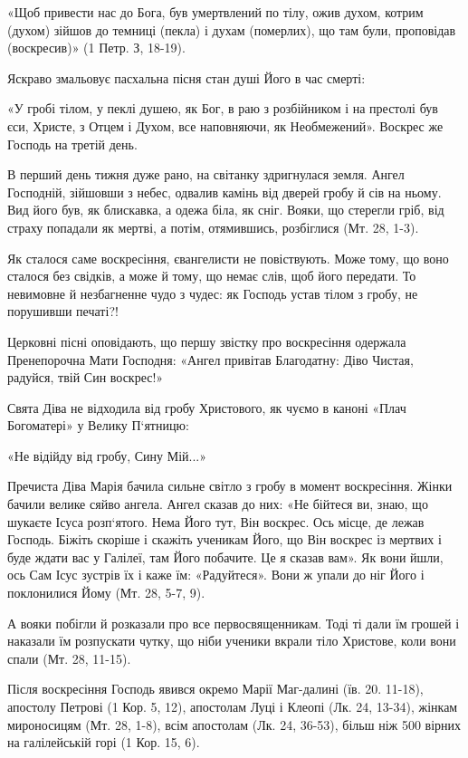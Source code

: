 \documentclass[main.tex]{subfiles}
\begin{document}
«Щоб привести нас до Бога, був умертвлений по тілу, ожив духом, котрим (духом) зійшов до темниці (пекла) і духам (померлих), що там були, проповідав (воскресив)» (1 Петр. З, 18-19).

Яскраво змальовує пасхальна пісня стан душі Його в час смерті:

«У гробі тілом, у пеклі душею, як Бог, в раю з розбійником і на престолі був єси, Христе, з Отцем і Духом, все наповняючи, як Необмежений».
Воскрес же Господь на третій день.

В перший день тижня дуже рано, на світанку здригнулася земля. Ангел Господній, зійшовши з небес, одвалив камінь від дверей гробу й сів на ньому. Вид його був, як блискавка, а одежа біла, як сніг. Вояки, що стерегли гріб, від страху попадали як мертві, а потім, отямившись, розбіглися (Мт. 28, 1-3).

Як сталося саме воскресіння, євангелисти не повіствують. Може тому, що воно сталося без свідків, а може й тому, що немає слів, щоб його передати. То невимовне й незбагненне чудо з чудес: як Господь устав тілом з гробу, не порушивши печаті?!

Церковні пісні оповідають, що першу звістку про воскресіння одержала Пренепорочна Мати Господня: «Ангел привітав Благодатну: Діво Чистая, радуйся, твій Син воскрес!»

Свята Діва не відходила від гробу Христового, як чуємо в каноні «Плач Богоматері» у Велику П`ятницю:
 
«Не відійду від гробу, Сину Мій...»

Пречиста Діва Марія бачила сильне світло з гробу в момент воскресіння. Жінки бачили велике сяйво ангела. Ангел сказав до них: «Не бійтеся ви, знаю, що шукаєте Ісуса розп`ятого. Нема Його тут, Він воскрес. Ось місце, де лежав Господь. Біжіть скоріше і скажіть ученикам Його, що Він воскрес із мертвих і буде ждати вас у Галілеї, там Його побачите. Це я сказав вам». Як вони йшли, ось Сам Ісус зустрів їх і каже їм: «Радуйтеся». Вони ж упали до ніг Його і поклонилися Йому (Мт. 28, 5-7, 9).

А вояки побігли й розказали про все первосвященникам. Тоді ті дали їм грошей і наказали їм розпускати чутку, що ніби ученики вкрали тіло Христове, коли вони спали (Мт. 28, 11-15).

Після воскресіння Господь явився окремо Марії Маг-далині (їв. 20. 11-18), апостолу Петрові (1 Кор. 5, 12), апостолам Луці і Клеопі (Лк. 24, 13-34), жінкам мироносицям (Мт. 28, 1-8), всім апостолам (Лк. 24, 36-53), більш ніж 500 вірних на галілейській горі (1 Кор. 15, 6).
\end{document}
